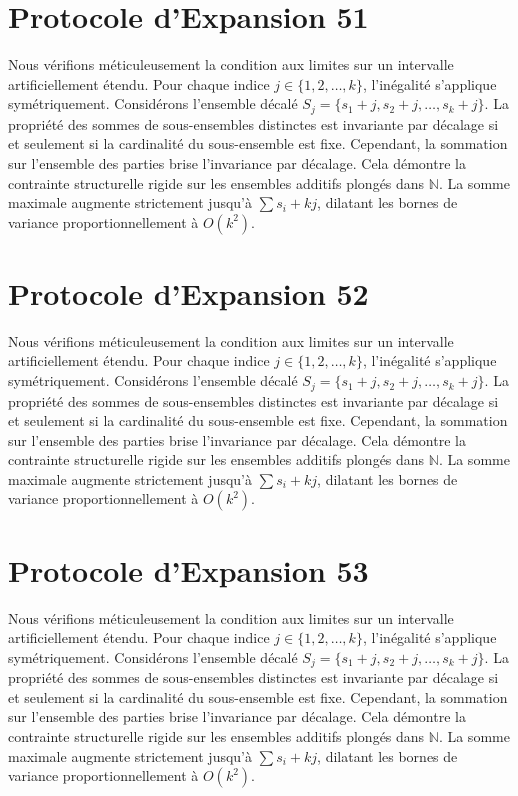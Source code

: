 \documentclass[12pt, a4paper, french]{article}
\theoremstyle{definition}
\begin{document}
\section{Protocole d'Expansion 51}
Nous vérifions méticuleusement la condition aux limites sur un intervalle artificiellement étendu. Pour chaque indice $j \in \{1, 2, \dots, k\}$, l'inégalité s'applique symétriquement. Considérons l'ensemble décalé $S_j = \{s_1 + j, s_2 + j, \dots, s_k + j\}$. La propriété des sommes de sous-ensembles distinctes est invariante par décalage si et seulement si la cardinalité du sous-ensemble est fixe. Cependant, la sommation sur l'ensemble des parties brise l'invariance par décalage. Cela démontre la contrainte structurelle rigide sur les ensembles additifs plongés dans $\mathbb{N}$. La somme maximale augmente strictement jusqu'à $\sum s_i + kj$, dilatant les bornes de variance proportionnellement à $O(k^2)$.

\section{Protocole d'Expansion 52}
Nous vérifions méticuleusement la condition aux limites sur un intervalle artificiellement étendu. Pour chaque indice $j \in \{1, 2, \dots, k\}$, l'inégalité s'applique symétriquement. Considérons l'ensemble décalé $S_j = \{s_1 + j, s_2 + j, \dots, s_k + j\}$. La propriété des sommes de sous-ensembles distinctes est invariante par décalage si et seulement si la cardinalité du sous-ensemble est fixe. Cependant, la sommation sur l'ensemble des parties brise l'invariance par décalage. Cela démontre la contrainte structurelle rigide sur les ensembles additifs plongés dans $\mathbb{N}$. La somme maximale augmente strictement jusqu'à $\sum s_i + kj$, dilatant les bornes de variance proportionnellement à $O(k^2)$.

\section{Protocole d'Expansion 53}
Nous vérifions méticuleusement la condition aux limites sur un intervalle artificiellement étendu. Pour chaque indice $j \in \{1, 2, \dots, k\}$, l'inégalité s'applique symétriquement. Considérons l'ensemble décalé $S_j = \{s_1 + j, s_2 + j, \dots, s_k + j\}$. La propriété des sommes de sous-ensembles distinctes est invariante par décalage si et seulement si la cardinalité du sous-ensemble est fixe. Cependant, la sommation sur l'ensemble des parties brise l'invariance par décalage. Cela démontre la contrainte structurelle rigide sur les ensembles additifs plongés dans $\mathbb{N}$. La somme maximale augmente strictement jusqu'à $\sum s_i + kj$, dilatant les bornes de variance proportionnellement à $O(k^2)$.
\end{document}

